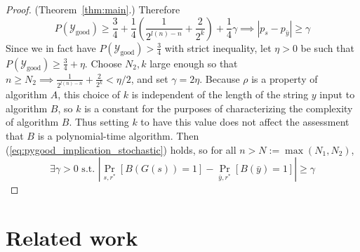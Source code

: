 \documentclass{article}
\def \Ygood{\mathcal{Y}_\text{good}}
\def \by{{\bar{y}}}
\theoremstyle{definition}
\theoremstyle{remark}
\begin{document}
\begin{proof}{(Theorem~\ref{thm:main}.)}
Therefore
\begin{equation} \label{eq:pygood_implication_stochastic}
P(\Ygood) \geq \frac{3}{4} + \frac{1}{4}(\frac{1}{2^{l(n) - n}} + \frac{2}{2^k}) + \frac{1}{4} \gamma \implies |p_s - p_\by| \geq \gamma
\end{equation}
Since we in fact have $P(\Ygood) > \frac{3}{4}$ with strict inequality, let $\eta > 0$ be such that $P(\Ygood) \geq \frac{3}{4} + \eta$.
Choose $N_2, k$ large enough so that $n \geq N_2 \implies \frac{1}{2^{l(n) - n}} + \frac{2}{2^k} < \eta/2$, and set $\gamma = 2\eta$.
Because $\rho$ is a property of algorithm $A$, this choice of $k$ is independent of the length of the string $y$ input to algorithm $B$, so $k$ is a constant for the purposes of characterizing the complexity of algorithm $B$.
Thus setting $k$ to have this value does not affect the assessment that $B$ is a polynomial-time algorithm.
Then (\ref{eq:pygood_implication_stochastic}) holds, so for all $n > N := \max(N_1, N_2)$,
$$
\exists \gamma > 0 \text{ s.t. } |\Pr_{s, r^*}[B(G(s)) = 1] - \Pr_{\by, r^*}[B(\by) = 1]| \geq \gamma
$$

\end{proof}

\section{Related work}
\end{document}
